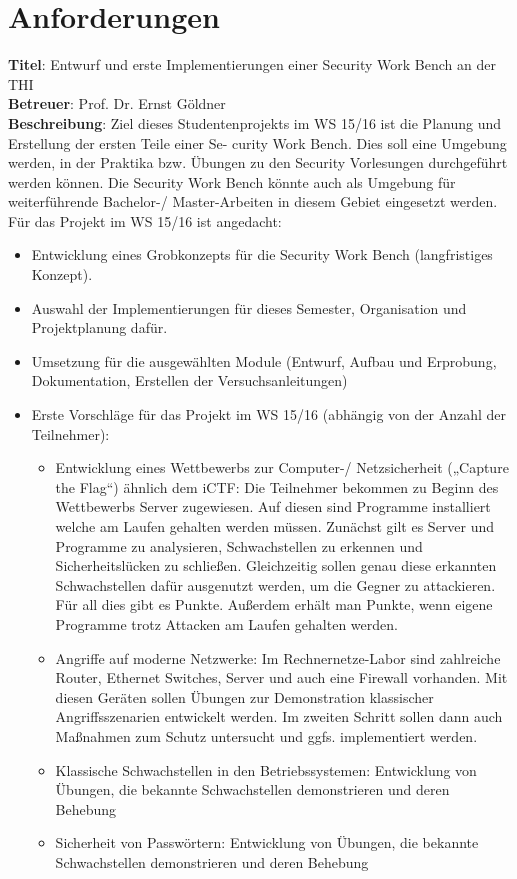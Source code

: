 \chapter{Anforderungen}

\textbf{Titel}: Entwurf und erste Implementierungen einer Security Work Bench an der THI \\
\textbf{Betreuer}: Prof. Dr. Ernst Göldner\\
\textbf{Beschreibung}:
Ziel dieses Studentenprojekts im WS 15/16 ist die Planung und Erstellung der ersten Teile einer Se-
curity Work Bench. Dies soll eine Umgebung werden, in der Praktika bzw. Übungen zu den Security
Vorlesungen durchgeführt werden können. Die Security Work Bench könnte auch als Umgebung für
weiterführende Bachelor-/ Master-Arbeiten in diesem Gebiet eingesetzt werden.\\
Für das Projekt im WS 15/16 ist angedacht:

\begin{itemize}
\item Entwicklung eines Grobkonzepts für die Security Work Bench (langfristiges Konzept).
\item Auswahl der Implementierungen für dieses Semester, Organisation und Projektplanung dafür.
\item Umsetzung für die ausgewählten Module (Entwurf, Aufbau und Erprobung, Dokumentation, Erstellen der Versuchsanleitungen)
\item Erste Vorschläge für das Projekt im WS 15/16 (abhängig von der Anzahl der Teilnehmer):
	\begin{itemize}
	\item Entwicklung eines Wettbewerbs zur Computer-/ Netzsicherheit („Capture the Flag“) ähnlich dem iCTF: Die Teilnehmer bekommen zu Beginn des Wettbewerbs Server zugewiesen. Auf diesen sind Programme installiert welche am Laufen gehalten werden müssen. Zunächst gilt es Server und Programme zu analysieren, Schwachstellen zu erkennen und Sicherheitslücken zu schließen. Gleichzeitig sollen genau diese erkannten Schwachstellen dafür ausgenutzt werden, um die Gegner zu attackieren. Für all dies gibt es Punkte. Außerdem erhält man Punkte, wenn eigene Programme trotz Attacken am Laufen gehalten werden.
	\item Angriffe auf moderne Netzwerke: Im Rechnernetze-Labor sind zahlreiche Router, Ethernet Switches, Server und auch eine Firewall vorhanden. Mit diesen Geräten sollen Übungen zur Demonstration klassischer Angriffsszenarien entwickelt werden. Im zweiten Schritt sollen dann auch Maßnahmen zum Schutz untersucht und ggfs. implementiert werden.
	\item Klassische Schwachstellen in den Betriebssystemen: Entwicklung von Übungen, die bekannte Schwachstellen demonstrieren und deren Behebung
	\item Sicherheit von Passwörtern: Entwicklung von Übungen, die bekannte Schwachstellen demonstrieren und deren Behebung
	\end{itemize}
\end{itemize}

